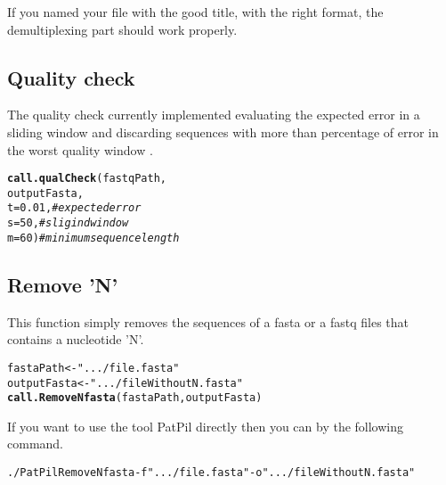 \documentclass{article}\usepackage[]{graphicx}\usepackage[]{color}
\makeatletter
\newcommand{\hlnum}[1]{\textcolor[rgb]{0.686,0.059,0.569}{#1}}%
\newcommand{\hlstr}[1]{\textcolor[rgb]{0.192,0.494,0.8}{#1}}%
\newcommand{\hlcom}[1]{\textcolor[rgb]{0.678,0.584,0.686}{\textit{#1}}}%
\newcommand{\hlstd}[1]{\textcolor[rgb]{0.345,0.345,0.345}{#1}}%
\newcommand{\hlkwb}[1]{\textcolor[rgb]{0.69,0.353,0.396}{#1}}%
\newcommand{\hlkwc}[1]{\textcolor[rgb]{0.333,0.667,0.333}{#1}}%
\newcommand{\hlkwd}[1]{\textcolor[rgb]{0.737,0.353,0.396}{\textbf{#1}}}%
\newenvironment{kframe}{%
 \def\at@end@of@kframe{}%
 \ifinner\ifhmode%
  \def\at@end@of@kframe{\end{minipage}}%
  \begin{minipage}{\columnwidth}%
 \fi\fi%
 \def\FrameCommand##1{\hskip\@totalleftmargin \hskip-\fboxsep
 \colorbox{shadecolor}{##1}\hskip-\fboxsep
     \hskip-\linewidth \hskip-\@totalleftmargin \hskip\columnwidth}%
 \MakeFramed {\advance\hsize-\width
   \@totalleftmargin\z@ \linewidth\hsize
   \@setminipage}}%
 {\par\unskip\endMakeFramed%
 \at@end@of@kframe}
\newenvironment{knitrout}{}{} %
\makeatother
\begin{document}
If you named your file with the good title, with the right format, the demultiplexing part should work properly.

\subsection{Quality check}
\label{subsec:qualcheck}

The quality check currently implemented evaluating the expected error in a sliding window and discarding sequences with more than percentage of error in the worst quality window \cite{DeVargas2015}.


\begin{knitrout}
\color{fgcolor}\begin{kframe}
\begin{alltt}
\hlkwd{call.qualCheck}\hlstd{(fastqPath,}
        \hlstd{outputFasta,}
        \hlkwc{t} \hlstd{=} \hlnum{0.01}\hlstd{,} \hlcom{# expected error}
        \hlkwc{s} \hlstd{=} \hlnum{50}\hlstd{,} \hlcom{# sligind window}
        \hlkwc{m} \hlstd{=} \hlnum{60}\hlstd{)} \hlcom{# minimum sequence length}
\end{alltt}
\end{kframe}
\end{knitrout}



\subsection{Remove 'N'}

This function simply removes the sequences of a fasta or a fastq files that contains a nucleotide 'N'.

\begin{knitrout}
\color{fgcolor}\begin{kframe}
\begin{alltt}
\hlstd{fastaPath} \hlkwb{<-} \hlstr{".../file.fasta"}
\hlstd{outputFasta} \hlkwb{<-} \hlstr{".../fileWithoutN.fasta"}
\hlkwd{call.RemoveNfasta}\hlstd{(fastaPath,outputFasta)}
\end{alltt}
\end{kframe}
\end{knitrout}

If you want to use the tool PatPil directly then you can by the following command.
\begin{knitrout}
\color{fgcolor}\begin{kframe}
\begin{alltt}
./PatPil RemoveNfasta -f \hlstr{".../file.fasta"} -o \hlstr{".../fileWithoutN.fasta"}
\end{alltt}
\end{kframe}
\end{knitrout}
\end{document}
